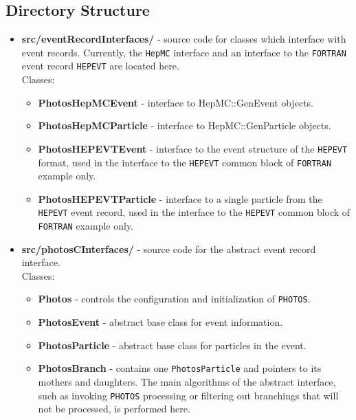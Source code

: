 \documentclass[]{Photos_interface_design}
\begin{document}
\subsection{Directory Structure}

\begin{itemize}
\item {\bf src/eventRecordInterfaces/ } - source code for classes which interface with event records.
      Currently, the {\tt HepMC} interface and an interface to the {\tt FORTRAN} event record {\tt HEPEVT} are located here.\\
  Classes:
  \begin{itemize}
  \item { \bf PhotosHepMCEvent} - interface to HepMC::GenEvent objects. 
  \item { \bf PhotosHepMCParticle} - interface to HepMC::GenParticle objects. 
  \item { \bf PhotosHEPEVTEvent} - interface to the event structure of the {\tt HEPEVT} format, used in the interface to the {\tt HEPEVT} common block of {\tt FORTRAN} example only. 
  \item { \bf PhotosHEPEVTParticle} - interface to a single particle from the {\tt HEPEVT} event record, used in the interface to the {\tt HEPEVT} common block of {\tt FORTRAN} example only.
  \end{itemize}   

\item {\bf src/photosCInterfaces/ } - source code for the abstract event record interface.  \\
  Classes:
  \begin{itemize}
  \item { \bf Photos } - controls the configuration and initialization of {\tt PHOTOS}.
  \item { \bf PhotosEvent } - abstract base class for event information.
  \item { \bf PhotosParticle } - abstract base class for particles in the event.
  \item { \bf PhotosBranch } - contains one {\tt PhotosParticle} and  pointers to its mothers and daughters.
                               The main algorithms of the abstract interface, such as invoking {\tt PHOTOS} processing
                               or filtering out branchings that will not be processed, is performed here.
  \end{itemize}


\end{itemize}
\end{document}

